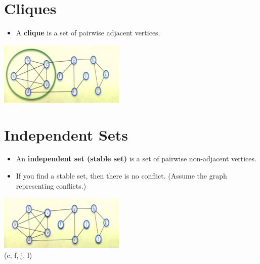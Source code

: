 \documentclass[12pt]{article}
\begin{document}
\section{Cliques}
\renewcommand{\labelitemii}{$\circ$}
\renewcommand{\labelitemiii}{$\cdot$}
\renewcommand{\labelitemiii}{$\rightarrow$}
\renewcommand{\labelitemiv}{$\star$}
\begin{itemize}
\item A \textbf{clique} is a set of pairwise adjacent vertices.
\end{itemize}
\begin{center}
\includegraphics{lecture717}
\end{center}


\section{Independent Sets}
\renewcommand{\labelitemii}{$\circ$}
\renewcommand{\labelitemiii}{$\cdot$}
\renewcommand{\labelitemiii}{$\rightarrow$}
\renewcommand{\labelitemiv}{$\star$}
\begin{itemize}
\item An \textbf{independent set (stable set)} is a set of pairwise non-adjacent vertices.
\item If you find a stable set, then there is no conflict. (Assume the graph representing conflicts.)
\end{itemize}
\begin{center}
\includegraphics{lecture718}\\
(c, f, j, l)
\end{center}
\end{document}
